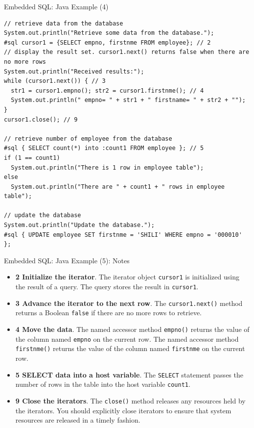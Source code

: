 \documentclass[aspectratio=169, xcolor=dvipsnames]{beamer}
\begin{document}
\begin{frame}[fragile]{Embedded SQL: Java Example (4)}
    \begin{verbatim}
// retrieve data from the database
System.out.println("Retrieve some data from the database.");
#sql cursor1 = {SELECT empno, firstnme FROM employee}; // 2
// display the result set. cursor1.next() returns false when there are no more rows
System.out.println("Received results:");
while (cursor1.next()) { // 3
  str1 = cursor1.empno(); str2 = cursor1.firstnme(); // 4
  System.out.println(" empno= " + str1 + " firstname= " + str2 + "");
}
cursor1.close(); // 9

// retrieve number of employee from the database
#sql { SELECT count(*) into :count1 FROM employee }; // 5
if (1 == count1)
  System.out.println("There is 1 row in employee table");
else
  System.out.println("There are " + count1 + " rows in employee table");

// update the database
System.out.println("Update the database.");
#sql { UPDATE employee SET firstnme = 'SHILI' WHERE empno = '000010' };
    \end{verbatim}
\end{frame}

\begin{frame}{Embedded SQL: Java Example (5): Notes}
    \begin{itemize}
        \item \textbf{2 Initialize the iterator}. The iterator object \texttt{cursor1} is initialized using the result of a query. The query stores the result in \texttt{cursor1}.
        \item \textbf{3 Advance the iterator to the next row}. The \texttt{cursor1.next()} method returns a Boolean \texttt{false} if there are no more rows to retrieve.
        \item \textbf{4 Move the data}. The named accessor method \texttt{empno()} returns the value of the column named \texttt{empno} on the current row. The named accessor method \texttt{firstnme()} returns the value of the column named \texttt{firstnme} on the current row.
        \item \textbf{5 SELECT data into a host variable}. The \texttt{SELECT} statement passes the number of rows in the table into the host variable \texttt{count1}.
        \item \textbf{9 Close the iterators}. The \texttt{close()} method releases any resources held by the iterators. You should explicitly close iterators to ensure that system resources are released in a timely fashion.
    \end{itemize}
\end{frame}
\end{document}
